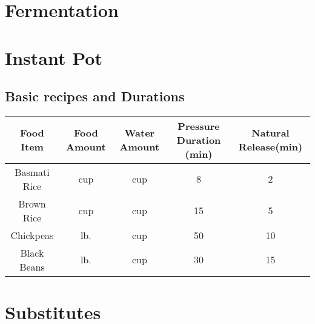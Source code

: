 \documentclass{article}
\begin{document}
\newpage


\newpage


\newpage


\newpage


\newpage
\section{Fermentation}


\section{Instant Pot}
\subsection*{Basic recipes and Durations}
\begin{table}[H]
    \centering
    \begin{tabular}{c|c|c|c|c}
        Food Item & Food Amount & Water Amount & Pressure Duration (min) & Natural Release(min) \\ \hline
        Basmati Rice & \unit[1]{cup} & \unit[1]{cup} & 8 & 2\\ \hline
        Brown Rice & \unit[1]{cup} & \unit[1]{cup} & 15 & 5 \\ \hline
        Chickpeas & \unit[1]{lb.} & \unit[6]{cup} & 50 & 10 \\ \hline
        Black Beans & \unit[1]{lb.} & \unit[6]{cup} & 30 & 15 \\
    \end{tabular}
    \label{tab:InstantPot}
\end{table}

\newpage


\newpage


\newpage


\newpage
\section{Substitutes}


\printindex
\end{document}
